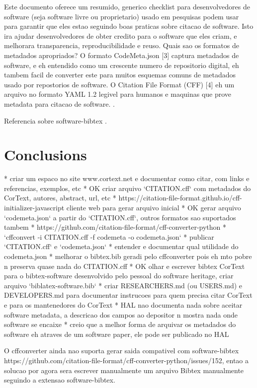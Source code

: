 \documentclass{article}
\begin{document}
Este documento oferece um resumido, generico checklist para desenvolvedores de software
(seja software livre ou proprietario) usado em pesquisas podem usar para garantir que eles
estao seguindo boas praticas sobre citacao de software. Isto ira ajudar desenvolvedores de
obter credito para o software que eles criam, e melhorara transparencia, reproducibilidade
e reuso.
Quais sao os formatos de metadados apropriados?
O formato CodeMeta.json [3]  captura metadados de software, e eh entendido como um crescente
numero de repositorio digital, eh tambem facil de converter este para muitos esquemas
comuns de metadados usado por repostorios de software.
O Citation File Format (CFF) [4] eh um arquivo no formato YAML 1.2 legivel para humanos e
maquinas que prove metadata para citacao de software.
\cite{chue_hong_software_2019}.

Referencia sobre software-bibtex \cite{softwareheritageorg_citing_2020}.

\section{Conclusions}

* criar um espaco no site www.cortext.net e documentar como citar, com links e referencias, exemplos, etc
* OK criar arquivo `CITATION.cff` com metadados do CorText, autores, abstract, url, etc
  * https://citation-file-format.github.io/cff-initializer-javascript cliente web para gerar arquivo inicial
* OK gerar arquivo `codemeta.json` a partir do `CITATION.cff`, outros formatos sao suportados tambem
  * https://github.com/citation-file-format/cff-converter-python
  * `cffconvert -i CITATION.cff -f codemeta -o codemeta.json`
* publicar `CITATION.cff` e `codemeta.json`
* entender e documentar qual utilidade do codemeta.json
* melhorar o bibtex.bib geradi pelo cffconverter pois eh mto pobre n preserva quase nada do CITATION.cff
* OK olhar e escrever bibtex CorText para o bibtex-software desenvolvido pelo pessoal do software heritage, criar arquivo `biblatex-software.bib`
* criar RESEARCHERS.md (ou USERS.md) e DEVELOPERS.md para documentar instrucoes para quem precisa citar CorText e para os mantenedores do CorText
* HAL nao documenta nada sobre aceitar software metadata, a descricao dos campos ao depositor n mostra nada onde software se encaixe
  * creio que a melhor forma de arquivar os metadados do software eh atraves de um software paper, ele pode ser publicado no HAL

O cffconverter ainda nao suporta gerar saida compativel com software-bibtex https://github.com/citation-file-format/cff-converter-python/issues/152,
entao a solucao por agora sera escrever manualmente um arquivo Bibtex manualmente seguindo a extensao software-bibtex.
\end{document}
